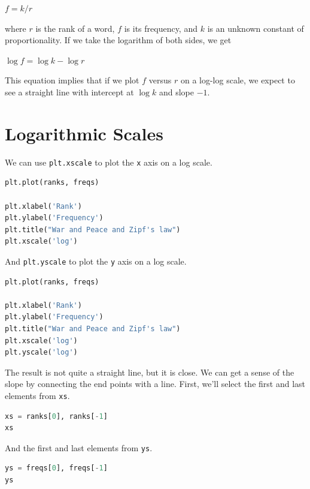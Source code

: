 \(f = k / r\)

where \(r\) is the rank of a word, \(f\) is its frequency, and \(k\) is
an unknown constant of proportionality. If we take the logarithm of both
sides, we get

\(\log f = \log k - \log r\)

This equation implies that if we plot \(f\) versus \(r\) on a log-log
scale, we expect to see a straight line with intercept at \(\log k\) and
slope \(-1\).

\hypertarget{logarithmic-scales}{%
\section{Logarithmic Scales}\label{logarithmic-scales}}

We can use \passthrough{\lstinline!plt.xscale!} to plot the
\passthrough{\lstinline!x!} axis on a log scale.

\begin{lstlisting}[language=Python,style=source]
plt.plot(ranks, freqs)

plt.xlabel('Rank')
plt.ylabel('Frequency')
plt.title("War and Peace and Zipf's law")
plt.xscale('log')
\end{lstlisting}

And \passthrough{\lstinline!plt.yscale!} to plot the
\passthrough{\lstinline!y!} axis on a log scale.

\begin{lstlisting}[language=Python,style=source]
plt.plot(ranks, freqs)

plt.xlabel('Rank')
plt.ylabel('Frequency')
plt.title("War and Peace and Zipf's law")
plt.xscale('log')
plt.yscale('log')
\end{lstlisting}

The result is not quite a straight line, but it is close. We can get a
sense of the slope by connecting the end points with a line. First,
we'll select the first and last elements from
\passthrough{\lstinline!xs!}.

\begin{lstlisting}[language=Python,style=source]
xs = ranks[0], ranks[-1]
xs
\end{lstlisting}

And the first and last elements from \passthrough{\lstinline!ys!}.

\begin{lstlisting}[language=Python,style=source]
ys = freqs[0], freqs[-1]
ys
\end{lstlisting}

